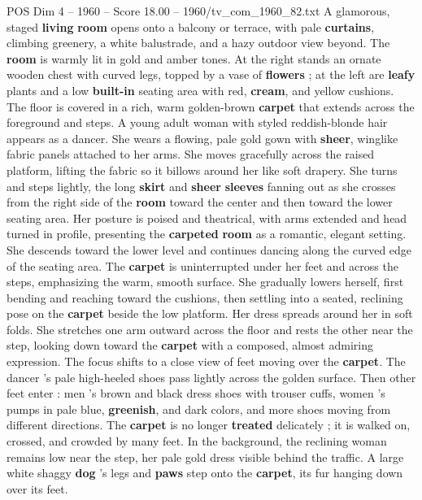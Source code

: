 \begin{textsample}{POS Dim 4 – 1960 – Score 18.00 – 1960/tv\_com\_1960\_82.txt}  \label{ex:f4_pos_062}
A glamorous, staged \textbf{living} \textbf{room} opens onto a balcony or terrace, with pale \textbf{curtains}, climbing greenery, a white balustrade, and a hazy outdoor view beyond.
The \textbf{room} is warmly lit in gold and amber tones.
At the right stands an ornate wooden chest with curved legs, topped by a vase of \textbf{flowers} ; at the left are \textbf{leafy} plants and a low \textbf{built-in} seating area with red, \textbf{cream}, and yellow cushions.
The floor is covered in a rich, warm golden-brown \textbf{carpet} that extends across the foreground and steps.
A young adult woman with styled reddish-blonde hair appears as a dancer.
She wears a flowing, pale gold gown with \textbf{sheer}, winglike fabric panels attached to her arms.
She moves gracefully across the raised platform, lifting the fabric so it billows around her like soft drapery.
She turns and steps lightly, the long \textbf{skirt} and \textbf{sheer} \textbf{sleeves} fanning out as she crosses from the right side of the \textbf{room} toward the center and then toward the lower seating area.
Her posture is poised and theatrical, with arms extended and head turned in profile, presenting the \textbf{carpeted} \textbf{room} as a romantic, elegant setting.
She descends toward the lower level and continues dancing along the curved edge of the seating area.
The \textbf{carpet} is uninterrupted under her feet and across the steps, emphasizing the warm, smooth surface.
She gradually lowers herself, first bending and reaching toward the cushions, then settling into a seated, reclining pose on the \textbf{carpet} beside the low platform.
Her dress spreads around her in soft folds.
She stretches one arm outward across the floor and rests the other near the step, looking down toward the \textbf{carpet} with a composed, almost admiring expression.
The focus shifts to a close view of feet moving over the \textbf{carpet}.
The dancer ’s pale high-heeled shoes pass lightly across the golden surface.
Then other feet enter : men ’s brown and black dress shoes with trouser cuffs, women ’s pumps in pale blue, \textbf{greenish}, and dark colors, and more shoes moving from different directions.
The \textbf{carpet} is no longer \textbf{treated} delicately ; it is walked on, crossed, and crowded by many feet.
In the background, the reclining woman remains low near the step, her pale gold dress visible behind the traffic.
A large white shaggy \textbf{dog} ’s legs and \textbf{paws} step onto the \textbf{carpet}, its fur hanging down over its feet.

\end{textsample}
